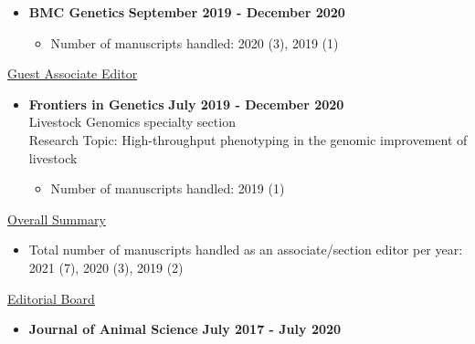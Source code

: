 \documentclass[margin,line,10pt]{res}
\begin{document}
\begin{resume}
\vspace{0.3cm}

\begin{itemize}
\item {\bf BMC Genetics} \hfill {\bf September 2019 - December 2020}
  \begin{itemize}
    \item Number of manuscripts handled: 2020 (3), 2019 (1)
  \end{itemize}
\end{itemize}

\vspace{0.3cm}

\underline{Guest Associate Editor}
\vspace{0.2cm}
\begin{itemize}
\item {\bf Frontiers in Genetics} \hfill  {\bf July 2019 - December 2020} \\
  Livestock Genomics specialty section \\
  Research Topic: High-throughput phenotyping in the genomic improvement of livestock
  \begin{itemize}
    \item Number of manuscripts handled: 2019 (1)
  \end{itemize}
\end{itemize}
\vspace{0.3cm}


\underline{Overall Summary}
 \vspace{.2cm}
\begin{itemize}
\item Total number of manuscripts handled as an associate/section editor per year: 2021 (7), 2020 (3), 2019 (2) 
\end{itemize}


\vspace{0.3cm}


\underline{Editorial Board}
 \vspace{.2cm}
\begin{itemize}
\item {\bf Journal of Animal Science} \hfill  {\bf July 2017 - July 2020} 
\end{itemize}






\end{resume}
\end{document}
